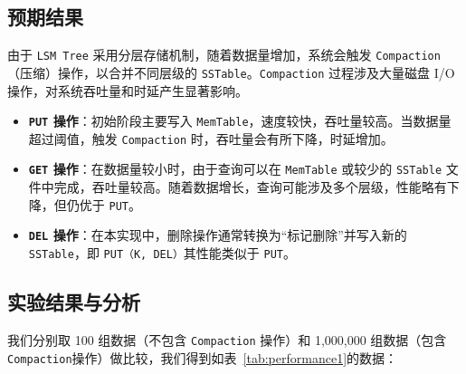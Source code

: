 \documentclass[fontset=windows]{article}
\begin{document}
	\subsection{预期结果}
	
	\hspace{2em}由于 \texttt{LSM Tree} 采用分层存储机制，随着数据量增加，系统会触发 \texttt{Compaction}（压缩）操作，以合并不同层级的 \texttt{SSTable}。\texttt{Compaction} 过程涉及大量磁盘 I/O 操作，对系统吞吐量和时延产生显著影响。
	
	\begin{itemize}
		\item \textbf{\texttt{PUT} 操作}：初始阶段主要写入 \texttt{MemTable}，速度较快，吞吐量较高。当数据量超过阈值，触发 \texttt{Compaction} 时，吞吐量会有所下降，时延增加。
		\item \textbf{\texttt{GET} 操作}：在数据量较小时，由于查询可以在 \texttt{MemTable} 或较少的 \texttt{SSTable} 文件中完成，吞吐量较高。随着数据增长，查询可能涉及多个层级，性能略有下降，但仍优于 \texttt{PUT}。
		\item \textbf{\texttt{DEL} 操作}：在本实现中，删除操作通常转换为“标记删除”并写入新的 \texttt{SSTable}，即 \texttt{PUT（K, DEL）}其性能类似于 \texttt{PUT}。
	\end{itemize}
		
	\subsection{实验结果与分析}
	
	\hspace{2em}
	我们分别取 100 组数据（不包含 \texttt{Compaction} 操作）和 1,000,000 组数据（包含 \texttt{Compaction}操作）做比较，我们得到如表~\ref{tab:performance1}的数据：
	
\end{document}
